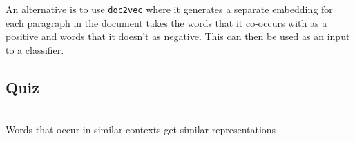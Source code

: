 An alternative is to use \texttt{doc2vec} where it generates a
separate embedding
for each paragraph in the document takes the words that it co-occurs
with as a positive
and words that it doesn't as negative. This can then be used as an
input to a classifier.

\subsection{Quiz}
\begin{quiz}
  ~\\
  Words that occur in similar contexts get similar representations
\end{quiz}

